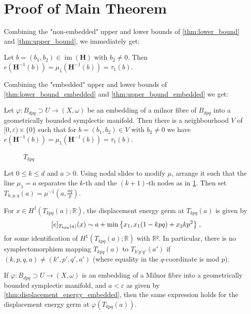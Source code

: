 \documentclass[12pt,a4paper,draft]{scrartcl}
\DeclareMathOperator{\im}{im}
\begin{document}
\section{Proof of Main Theorem}

Combining the "non-embedded" upper and lower bounds of \cref{thm:lower_bound} and \cref{thm:upper_bound}, we immediately get:

\begin{theorem}
  \label{thm:displacement_energy}
  Let $b=(b_1,b_2) ∈ \im(\symbf{H})$ with $b_2 ≠ 0$. Then $e(\symbf{H}^{-1}(b)) = μ_1(\symbf{H}^{-1}(b)) = τ_1(b)$.
\end{theorem}

Combining the "embedded" upper and lower bounds of \cref{thm:lower_bound_embedded} and \cref{thm:upper_bound_embedded} we get:

\begin{theorem}
  \label{thm:displacement_energy_embedded}
  Let $φ \colon B_{dpq} ⊃ U → (X,ω)$ be an embedding of a milnor fibre of $B_{dpq}$ into a geometrically bounded symplectic manifold. Then there is a neighbourhood $V$ of $[0,ε) × \{0\}$ such that for $b = (b_1,b_2) ∈ V$ with $b_2 ≠ 0$ we have $e(\symbf{H}^{-1}(b)) = μ_1(\symbf{H}^{-1}(b)) = τ_1(b)$.
\end{theorem}

\begin{figure}
  \centering
  \caption{$T_{kpq}$}
  \label{fig:tkpq_def}
\end{figure}

\begin{definition}
  Let $0 ≤ k ≤ d$ and $a>0$.
  Using nodal slides to modify $μ$, arrange it such that the line $μ_1 = a$ separates the $k$-th and the $(k+1)$-th nodes as in \cref{fig:tkpq_def}.
  Then set $T_{k,p,q}(a) = μ^{-1}(a,\frac{aq}{p})$.
\end{definition}

\begin{theorem}
  \label{thm:main}

  For $x ∈ H^1(T_{kpq}(a); ℝ)$, the displacement energy germ at $T_{kpq}(a)$ is given by
  \[ [e]_{T_{kpq}(a)} (x) \sim a + \min\qty{x_1, x_1 (1-kpq) + x_2 k p^2} \; , \]
  for some identification of $H^1(T_{kpq}(a);ℝ)$ with $ℝ²$.
  In particular, there is no symplectomorphism mapping $T_{kpq}(a)$ to $T_{k'p'q'}(a')$ if $(k,p,q,a) ≠ (k',p',q',a')$ (where equality in the $q$-coordinate is mod $p$).

  If $φ \colon B_{dpq} ⊃ U → (X,ω)$ is an embedding of a Milnor fibre into a geometrically bounded symplectic manifold, and $a<ε$ as given by \cref{thm:displacement_energy_embedded}, then the same expression holds for the displacement energy germ at $φ(T_{kpq}(a))$.
\end{theorem}
\end{document}
